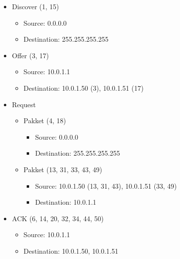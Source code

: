 
\begin{itemize}
    \item Discover (1, 15) 
    \begin{itemize}
        \item Source: 0.0.0.0
        \item Destination: 255.255.255.255
    \end{itemize}
    \item Offer (3, 17)
    \begin{itemize}
        \item Source: 10.0.1.1
        \item Destination: 10.0.1.50 (3), 10.0.1.51 (17)
    \end{itemize}
    \item Request 
    \begin{itemize}
        \item Pakket (4, 18)
        \begin{itemize}
            \item Source: 0.0.0.0
            \item Destination: 255.255.255.255
        \end{itemize}
        \item Pakket (13, 31, 33, 43, 49)
        \begin{itemize} 
            \item Source: 10.0.1.50 (13, 31, 43), 10.0.1.51  (33, 49)
            \item Destination: 10.0.1.1
        \end{itemize}
    \end{itemize}
    \item ACK (6, 14, 20, 32, 34, 44, 50)
    \begin{itemize}
        \item Source: 10.0.1.1
        \item Destination: 10.0.1.50, 10.0.1.51 
    \end{itemize}
\end{itemize}